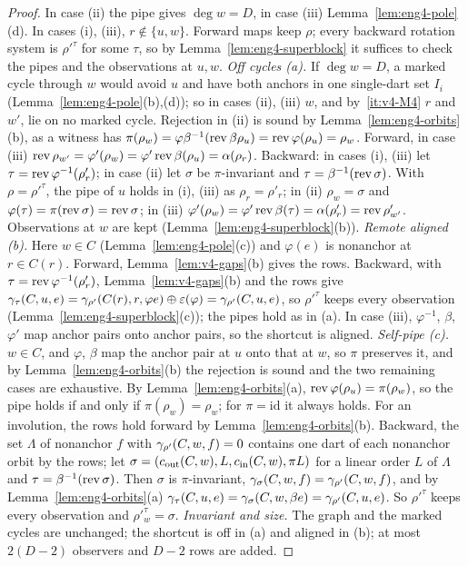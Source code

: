\begin{proof}
In case (ii) the pipe gives $\deg w=D$, in case (iii)
Lemma~\ref{lem:eng4-pole}(d). In cases (i), (iii), $r\notin\{u,w\}$. Forward
maps keep $\rho$; every backward rotation system is $\rho'^\tau$ for some
$\tau$, so by Lemma~\ref{lem:eng4-superblock} it suffices to check the pipes and the
observations at $u,w$.
\emph{Off cycles (a).} If $\deg w=D$, a marked cycle through $w$ would avoid
$u$ and have both anchors in one single-dart set $I_i$
(Lemma~\ref{lem:eng4-pole}(b),(d)); so in cases (ii), (iii) $w$, and
by~\ref{it:v4-M4} $r$ and $w'$, lie on no marked cycle. Rejection in (ii) is
sound by Lemma~\ref{lem:eng4-orbits}(b), as a witness has $\pi(\rho_w)=\varphi\beta^{-1}(\operatorname{rev}\beta\rho_u)=
\operatorname{rev}\varphi(\rho_u)=\rho_w$. Forward, in case (iii)
$\operatorname{rev}\rho_{w'}=\varphi'(\rho_w)=\varphi'\operatorname{rev}\beta(\rho_u)=\alpha(\rho_r)$.
Backward: in cases (i), (iii) let $\tau=\operatorname{rev}\varphi^{-1}(\rho'_r)$; in case
(ii) let $\sigma$ be $\pi$-invariant and $\tau=\beta^{-1}(\operatorname{rev}\sigma)$. With
$\rho=\rho'^\tau$, the pipe of $u$ holds in (i), (iii) as $\rho_r=\rho'_r$;
in (ii) $\rho_w=\sigma$ and $\varphi(\tau)=\pi(\operatorname{rev}\sigma)=\operatorname{rev}\sigma$; in
(iii) $\varphi'(\rho_w)=\varphi'\operatorname{rev}\beta(\tau)=\alpha(\rho'_r)=
\operatorname{rev}\rho'_{w'}$. Observations at $w$ are kept
(Lemma~\ref{lem:eng4-superblock}(b)).
\emph{Remote aligned (b).} Here $w\in C$ (Lemma~\ref{lem:eng4-pole}(c)) and
$\varphi(e)$ is nonanchor at $r\in C(r)$. Forward,
Lemma~\ref{lem:v4-gaps}(b) gives the rows. Backward, with
$\tau=\operatorname{rev}\varphi^{-1}(\rho'_r)$, Lemma~\ref{lem:v4-gaps}(b) and the rows
give $\gamma_\tau(C,u,e)=\gamma_{\rho'}(C(r),r,\varphi e)\oplus
\varepsilon(\varphi)=\gamma_{\rho'}(C,u,e)$, so $\rho'^\tau$ keeps every
observation (Lemma~\ref{lem:eng4-superblock}(c)); the pipes hold as in (a).
In case (iii), $\varphi^{-1}$, $\beta$, $\varphi'$ map anchor pairs onto
anchor pairs, so the shortcut is aligned.
\emph{Self-pipe (c).} $w\in C$, and $\varphi$, $\beta$ map the anchor pair
at $u$ onto that at $w$, so $\pi$ preserves it, and by Lemma~\ref{lem:eng4-orbits}(b) the
rejection is sound and the two remaining cases are exhaustive. By Lemma~\ref{lem:eng4-orbits}(a),
$\operatorname{rev}\varphi(\rho_u)=\pi(\rho_w)$, so the pipe holds if and only if
$\pi(\rho_w)=\rho_w$; for $\pi=\mathrm{id}$ it always holds. For an
involution, the rows hold forward by Lemma~\ref{lem:eng4-orbits}(b).
Backward, the set $\Lambda$ of nonanchor $f$ with $\gamma_{\rho'}(C,w,f)=0$
contains one dart of each nonanchor orbit by the rows; let
$\sigma=(c_{\mathrm{out}}(C,w),L,c_{\mathrm{in}}(C,w),\pi L)$ for a linear order $L$ of
$\Lambda$ and $\tau=\beta^{-1}(\operatorname{rev}\sigma)$. Then $\sigma$ is
$\pi$-invariant, $\gamma_\sigma(C,w,f)=\gamma_{\rho'}(C,w,f)$, and by
Lemma~\ref{lem:eng4-orbits}(a) $\gamma_\tau(C,u,e)=\gamma_\sigma(C,w,\beta e)=
\gamma_{\rho'}(C,u,e)$. So $\rho'^\tau$ keeps every observation and
$\rho'^\tau_w=\sigma$.
\emph{Invariant and size.} The graph and the marked cycles are unchanged;
the shortcut is off in (a) and aligned in (b); at most $2(D-2)$ observers
and $D-2$ rows are added.
\end{proof}

